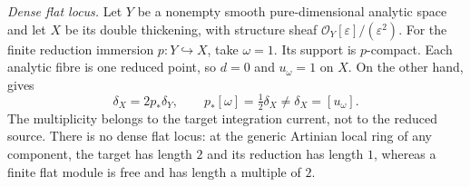 \item \emph{Dense flat locus.}  Let $Y$ be a nonempty smooth pure-dimensional
  analytic space and let $X$ be its double thickening, with structure
  sheaf $\mathcal O_Y[\varepsilon]/(\varepsilon^2)$.
  For the finite reduction immersion $p:Y\hookrightarrow X$, take
  $\omega=1$.  Its support is $p$-compact.  Each analytic fibre is one
  reduced point, so $d=0$ and $u_\omega=1$ on $X$.  On the other hand,
   gives
  \[
       \delta_X=2p_*\delta_Y,\qquad
       p_*[\omega]=\tfrac12\delta_X
                  \ne\delta_X=[u_\omega].
  \]
  The multiplicity belongs to the target integration current, not to
  the reduced source.  There is no dense flat locus: at the generic
  Artinian local ring of any component, the target has length $2$ and
  its reduction has length $1$, whereas a finite flat module is free
  and has length a multiple of $2$.
